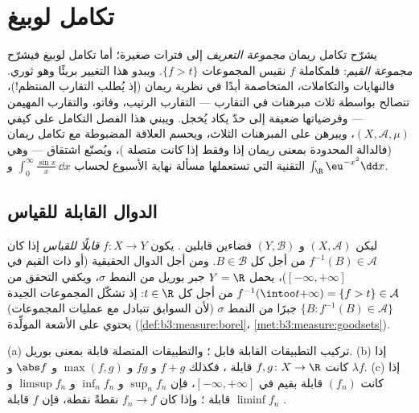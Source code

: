 \chapter{تكامل لوبيغ}\label{ch:b3:lebesgue}

يشرّح تكامل ريمان \emph{مجموعة التعريف} إلى فترات صغيرة؛ أما
تكامل لوبيغ فيشرّح \emph{مجموعة القيم}: فلمكاملة $f$ نقيس
المجموعات $\{f > t\}$. ويبدو هذا التغيير بريئًا وهو ثوري.
فالنهايات والتكاملات، المتخاصمة أبدًا في نظرية ريمان (إذ يُطلب
التقارب المنتظم!)، تتصالح بواسطة ثلاث مبرهنات في التقارب ---
التقارب الرتيب، وفاتو، والتقارب المهيمن --- وفرضياتها ضعيفة إلى
حدّ يكاد يُخجل. ويبني هذا الفصل التكامل على  كيفي
$(X, \mathcal A,
\mu)$، ويبرهن على المبرهنات الثلاث، ويحسم العلاقة المضبوطة مع
تكامل ريمان (فالدالة المحدودة  بمعنى ريمان إذا
وفقط إذا كانت متصلة )، ويُصنّع اشتقاق
 --- وهي التقنية التي تستعملها مسألة
نهاية الأسبوع لحساب $\int_0^\infty\frac{\sin x}x\,\dd x$ و $\int_\R \eu^{-x^2}\dd x$.

\section{الدوال القابلة للقياس}

\begin{definition}\label{def:b3:lebesgue:measurable}
ليكن $(X, \mathcal A)$ و $(Y, \mathcal B)$ فضاءين قابلين . يكون $f \colon X \to Y$ \emph{قابلًا
للقياس} إذا كان $f^{-1}(B) \in \mathcal A$ من أجل كل $B \in
\mathcal B$.
ومن أجل الدوال الحقيقية (أو ذات القيم في $[-\infty,+\infty]$)، يحمل $Y = \R$
جبر بوريل من النمط $\sigma$، ويكفي التحقق من $f^{-1}(\intoo t{+\infty}) = \{f > t\} \in
\mathcal A$ من أجل كل
$t \in \R$: إذ تشكّل المجموعات الجيدة $\{B :
f^{-1}(B) \in \mathcal A\}$ جبرًا من النمط
$\sigma$ (لأن السوابق تتبادل مع عمليات المجموعات) يحتوي على
الأشعة المولِّدة (\cref{def:b3:measure:borel}، \cref{met:b3:measure:goodsets}).
\end{definition}

\begin{proposition}\label{prop:b3:lebesgue:stability}
(a) تركيب التطبيقات القابلة  قابل ؛ والتطبيقات
المتصلة قابلة  بمعنى بوريل.
(b) إذا كانت $f, g \colon X \to \R$ قابلة ، فكذلك $f + g$ و $fg$
و $\max(f,g)$ و $\abs f$ و $\lambda f$.
(c) إذا كانت $(f_n)$ قابلة  بقيم في $[-\infty, +\infty]$، فإن
$\sup_nf_n$ و $\inf_nf_n$ و $\limsup f_n$ و $\liminf f_n$ قابلة
؛ وإذا كان $f_n \to f$ نقطةً نقطة، فإن $f$ قابلة .
\end{proposition}

